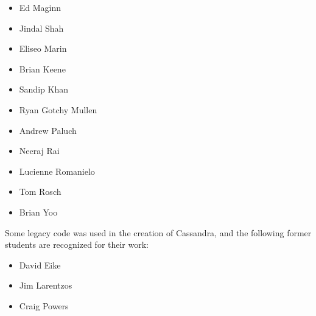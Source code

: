 \begin{itemize}

\item Ed Maginn
\item Jindal Shah
\item Eliseo Marin
\item Brian Keene
\item Sandip Khan
\item Ryan Gotchy Mullen
\item Andrew Paluch
\item Neeraj Rai
\item Lucienne Romanielo
\item Tom Rosch
\item Brian Yoo
\end{itemize}


Some legacy code was used in the creation of Cassandra, and the following former students are recognized for their work:

\begin{itemize}
\item David Eike
\item Jim Larentzos
\item Craig Powers
\end{itemize}
